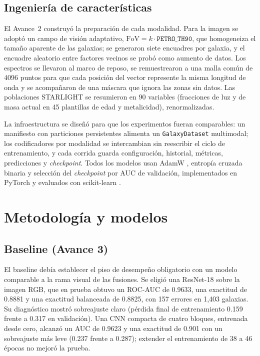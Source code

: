 \documentclass[letterpaper,11pt]{article}
\begin{document}
\subsection{Ingeniería de características}
El Avance~2 construyó la preparación de cada modalidad. Para la imagen se adoptó un campo de visión adaptativo, $\mathrm{FoV} = k \cdot \texttt{PETRO\_TH90}$, que homogeneiza el tamaño aparente de las galaxias; se generaron siete encuadres por galaxia, y el encuadre aleatorio entre factores vecinos se probó como aumento de datos. Los espectros se llevaron al marco de reposo, se remuestrearon a una malla común de 4096 puntos para que cada posición del vector represente la misma longitud de onda y se acompañaron de una máscara que ignora las zonas sin datos. Las poblaciones STARLIGHT se resumieron en 90 variables (fracciones de luz y de masa actual en 45 plantillas de edad y metalicidad), renormalizadas.

La infraestructura se diseñó para que los experimentos fueran comparables: un manifiesto con particiones persistentes alimenta un \texttt{GalaxyDataset} multimodal; los codificadores por modalidad se intercambian sin reescribir el ciclo de entrenamiento, y cada corrida guarda configuración, historial, métricas, predicciones y \emph{checkpoint}. Todos los modelos usan AdamW \parencite{loshchilov2019}, entropía cruzada binaria y selección del \emph{checkpoint} por AUC de validación, implementados en PyTorch \parencite{paszke2019} y evaluados con scikit-learn \parencite{pedregosa2011}.

\section{Metodología y modelos}

\subsection{Baseline (Avance 3)}
El baseline debía establecer el piso de desempeño obligatorio con un modelo comparable a la rama visual de las fusiones. Se eligió una ResNet-18 \parencite{he2016} sobre la imagen RGB, que en prueba obtuvo un ROC-AUC de 0.9633, una exactitud de 0.8881 y una exactitud balanceada de 0.8825, con 157 errores en 1,403 galaxias. Su diagnóstico mostró sobreajuste claro (pérdida final de entrenamiento 0.159 frente a 0.317 en validación). Una CNN compacta de cuatro bloques, entrenada desde cero, alcanzó un AUC de 0.9623 y una exactitud de 0.901 con un sobreajuste más leve (0.237 frente a 0.287); extender el entrenamiento de 38 a 46 épocas no mejoró la prueba.
\end{document}
